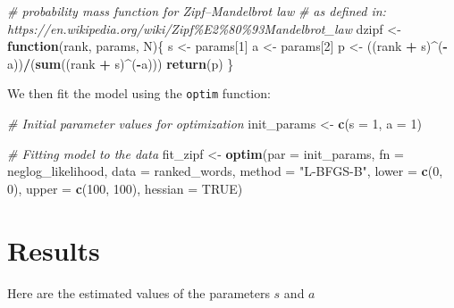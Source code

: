 \documentclass[
]{book}
\newenvironment{Shaded}{\begin{snugshade}}{\end{snugshade}}
\newcommand{\AttributeTok}[1]{\textcolor[rgb]{0.13,0.29,0.53}{#1}}
\newcommand{\CommentTok}[1]{\textcolor[rgb]{0.56,0.35,0.01}{\textit{#1}}}
\newcommand{\ConstantTok}[1]{\textcolor[rgb]{0.56,0.35,0.01}{#1}}
\newcommand{\ControlFlowTok}[1]{\textcolor[rgb]{0.13,0.29,0.53}{\textbf{#1}}}
\newcommand{\DecValTok}[1]{\textcolor[rgb]{0.00,0.00,0.81}{#1}}
\newcommand{\FunctionTok}[1]{\textcolor[rgb]{0.13,0.29,0.53}{\textbf{#1}}}
\newcommand{\NormalTok}[1]{#1}
\newcommand{\OtherTok}[1]{\textcolor[rgb]{0.56,0.35,0.01}{#1}}
\newcommand{\SpecialCharTok}[1]{\textcolor[rgb]{0.81,0.36,0.00}{\textbf{#1}}}
\newcommand{\StringTok}[1]{\textcolor[rgb]{0.31,0.60,0.02}{#1}}
\begin{document}
\begin{Shaded}
\begin{Highlighting}[]
\CommentTok{\# probability mass function for Zipf–Mandelbrot law}
\CommentTok{\# as defined in: https://en.wikipedia.org/wiki/Zipf\%E2\%80\%93Mandelbrot\_law}
\NormalTok{dzipf }\OtherTok{\textless{}{-}} \ControlFlowTok{function}\NormalTok{(rank, params, N)\{}
\NormalTok{  s }\OtherTok{\textless{}{-}}\NormalTok{ params[}\DecValTok{1}\NormalTok{]}
\NormalTok{  a }\OtherTok{\textless{}{-}}\NormalTok{ params[}\DecValTok{2}\NormalTok{]}
\NormalTok{  p }\OtherTok{\textless{}{-}}\NormalTok{ ((rank }\SpecialCharTok{+}\NormalTok{ s)}\SpecialCharTok{\^{}}\NormalTok{(}\SpecialCharTok{{-}}\NormalTok{a))}\SpecialCharTok{/}\NormalTok{(}\FunctionTok{sum}\NormalTok{((rank }\SpecialCharTok{+}\NormalTok{ s)}\SpecialCharTok{\^{}}\NormalTok{(}\SpecialCharTok{{-}}\NormalTok{a)))}
  \FunctionTok{return}\NormalTok{(p)}
\NormalTok{\}}
\end{Highlighting}
\end{Shaded}

We then fit the model using the \texttt{optim} function:

\begin{Shaded}
\begin{Highlighting}[]
\CommentTok{\# Initial parameter values for optimization}
\NormalTok{init\_params }\OtherTok{\textless{}{-}} \FunctionTok{c}\NormalTok{(}\AttributeTok{s =} \DecValTok{1}\NormalTok{, }\AttributeTok{a =} \DecValTok{1}\NormalTok{)}

\CommentTok{\# Fitting model to the data}
\NormalTok{fit\_zipf }\OtherTok{\textless{}{-}} \FunctionTok{optim}\NormalTok{(}\AttributeTok{par =}\NormalTok{ init\_params, }
                \AttributeTok{fn =}\NormalTok{ neglog\_likelihood, }
                \AttributeTok{data =}\NormalTok{ ranked\_words,}
                \AttributeTok{method =} \StringTok{"L{-}BFGS{-}B"}\NormalTok{, }
                \AttributeTok{lower =} \FunctionTok{c}\NormalTok{(}\DecValTok{0}\NormalTok{, }\DecValTok{0}\NormalTok{),}
                \AttributeTok{upper =} \FunctionTok{c}\NormalTok{(}\DecValTok{100}\NormalTok{, }\DecValTok{100}\NormalTok{),}
                \AttributeTok{hessian =} \ConstantTok{TRUE}\NormalTok{)}
\end{Highlighting}
\end{Shaded}

\section{Results}\label{results}

Here are the estimated values of the parameters \(s\) and \(a\)
\end{document}
